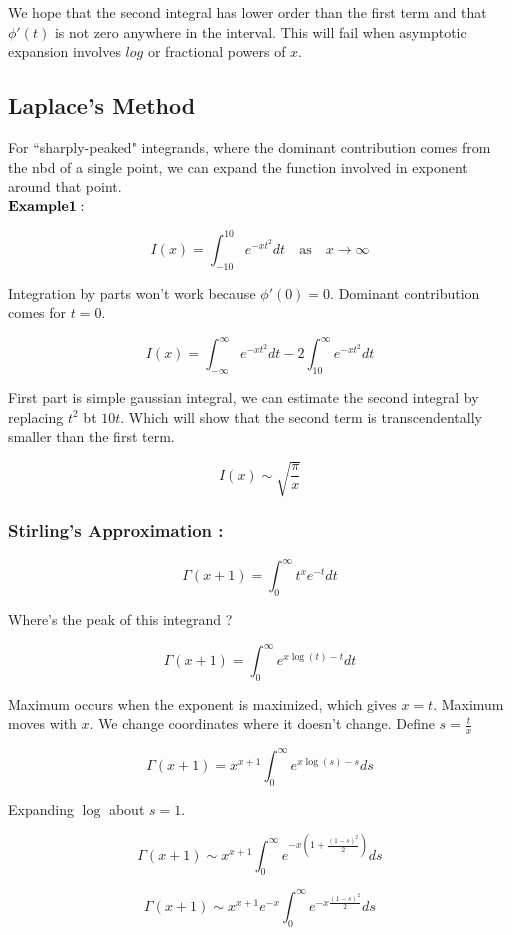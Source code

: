 \documentclass{report}
\begin{document}
We hope that the second integral has lower order than the first term and that $\phi'(t)$ is not zero anywhere in the interval. This will fail when asymptotic expansion involves $log$ or fractional powers of $x$.

\subsection{Laplace's Method}

For ``sharply-peaked" integrands, where the dominant contribution comes from the nbd of a single point, we can expand the function involved in exponent around that point.\\

\noindent $\bold{Example 1 :}$

$$ I(x) = \int_{-10}^{10}e^{-xt^2}dt \quad\mathrm{as}\quad x\to\infty$$

\noindent Integration by parts won't work because $\phi'(0) = 0$. Dominant contribution comes for $t=0$. 

$$I(x) = \int_{-\infty}^{\infty}e^{-xt^2}dt - 2\int_{10}^{\infty}e^{-xt^2}dt$$

\noindent First part is simple gaussian integral, we can estimate the second integral by replacing $t^2$ bt $10t$. Which will show that the second term is transcendentally smaller than the first term.

$$I(x) \sim \sqrt{\frac{\pi}{x}}$$

\subsubsection{Stirling's Approximation :}

$$\Gamma(x+1) = \int_{0}^{\infty}t^x e^{-t}dt$$

\noindent Where's the peak of this integrand ? 

$$ \Gamma(x+1) = \int_{0}^{\infty}e^{x\log(t)-t}dt$$

\noindent Maximum occurs when the exponent is maximized, which gives $x = t$. Maximum moves with $x$. We change coordinates where it doesn't change. Define $ s = \frac{t}{x}$

$$\Gamma(x+1) = x^{x+1}\int_{0}^{\infty}e^{x\log(s) - s}ds$$

\noindent Expanding $\log$ about $s=1$.

$$\Gamma(x+1) \sim x^{x+1}\int_{0}^{\infty}e^{-x\left(1+\frac{(1-s)^2}{2}\right)}ds$$

$$\Gamma(x+1) \sim x^{x+1}e^{-x}\int_{0}^{\infty}e^{-x\frac{(1-s)^2}{2}}ds$$
\end{document}
